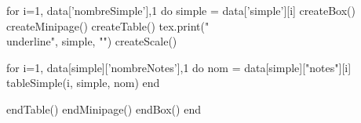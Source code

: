 \documentclass[10pt, letterpaper, twoside]{article}
\begin{document}
\vspace{1em}

\begin{luacode}
    for i=1, data['nombreSimple'],1 do
        simple = data['simple'][i]
        createBox()
        createMinipage()
        createTable()
        tex.print("\\underline{", simple, "}")
        createScale()

        for i=1, data[simple]['nombreNotes'],1 do
            nom = data[simple]["notes"][i]
            tableSimple(i, simple, nom)
        end
        
        endTable()
        endMinipage()
        endBox()
    end
\end{luacode}
\end{document}
